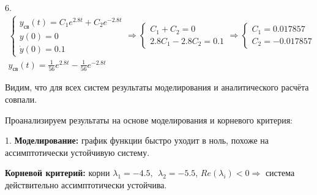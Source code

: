 \vspace{1em}
\begin{par}
\begin{flushleft}
6. $\begin{array}{l}
\left\lbrace \begin{array}{c}
y_{св} (t)=C_1 e^{2.8t} +C_2 e^{-2.8t} \\
y(0)=0\\
\dot{y} (0)=0.1
\end{array}\right.\Rightarrow \left\lbrace \begin{array}{c}
C_1 +C_2 =0\\
2.8C_1 -2.8C_2 =0.1
\end{array}\right.\Rightarrow \left\lbrace \begin{array}{c}
C_1 =0.017857\\
C_2 =-0.017857
\end{array}\right.\\
y_{\textrm{св}} (t)=\frac{1}{56}e^{2.8t} -\frac{1}{56}e^{-2.8t} 
\end{array}$
\end{flushleft}
\end{par}

\begin{par}
\begin{flushleft}
Видим, что для всех систем результаты моделирования и аналитического расчёта совпали.
\end{flushleft}
\end{par}

\begin{par}
\begin{flushleft}
Проанализируем результаты на основе моделирования и корневого критерия:
\end{flushleft}
\end{par}

\begin{par}
\begin{flushleft}
1. \textbf{Моделирование: }график функции быстро уходит в ноль, похоже на ассимптотически устойчивую систему.
\end{flushleft}
\end{par}

\begin{par}
\begin{flushleft}
   \textbf{Корневой критерий:} корни $\lambda_1 =-4.5,~~\lambda_2 =-5.5$, $Re(\lambda_i )<0\Rightarrow$ система действительно ассимптотически устойчива.
\end{flushleft}
\end{par}

